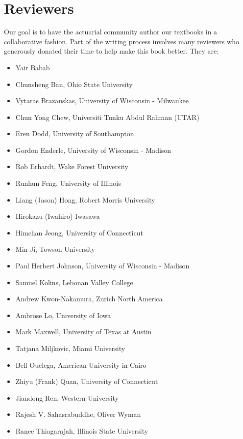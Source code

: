 \documentclass[]{book}
\providecommand{\tightlist}{%
  \setlength{\itemsep}{0pt}\setlength{\parskip}{0pt}}
\theoremstyle{definition}
\theoremstyle{definition}
\theoremstyle{definition}
\theoremstyle{remark}
\begin{document}
\section*{Reviewers}\label{reviewers}

Our goal is to have the actuarial community author our textbooks in a
collaborative fashion. Part of the writing process involves many
reviewers who generously donated their time to help make this book
better. They are:

\begin{itemize}
\tightlist
\item
  Yair Babab
\item
  Chunsheng Ban, Ohio State University
\item
  Vytaras Brazauskas, University of Wisconsin - Milwaukee
\item
  Chun Yong Chew, Universiti Tunku Abdul Rahman (UTAR)
\item
  Eren Dodd, University of Southampton
\item
  Gordon Enderle, University of Wisconsin - Madison
\item
  Rob Erhardt, Wake Forest University
\item
  Runhun Feng, University of Illinois
\item
  Liang (Jason) Hong, Robert Morris University
\item
  Hirokazu (Iwahiro) Iwasawa
\item
  Himchan Jeong, University of Connecticut
\item
  Min Ji, Towson University
\item
  Paul Herbert Johnson, University of Wisconsin - Madison
\item
  Samuel Kolins, Lebonan Valley College
\item
  Andrew Kwon-Nakamura, Zurich North America
\item
  Ambrose Lo, University of Iowa
\item
  Mark Maxwell, University of Texas at Austin
\item
  Tatjana Miljkovic, Miami University
\item
  Bell Ouelega, American University in Cairo
\item
  Zhiyu (Frank) Quan, University of Connecticut
\item
  Jiandong Ren, Western University
\item
  Rajesh V. Sahasrabuddhe, Oliver Wyman
\item
  Ranee Thiagarajah, Illinois State University

\end{itemize}
\end{document}

